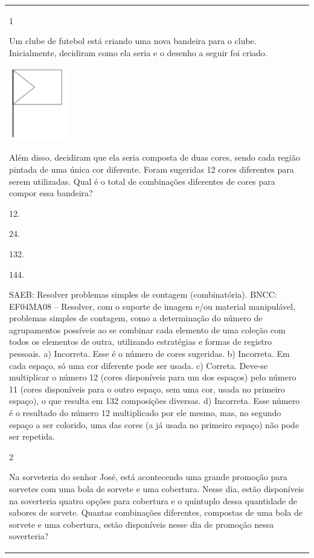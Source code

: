 \begin{mdframed}[linewidth=2pt,linecolor=salmao,roundcorner=2pt]
\begin{escolha}
{{{\begin{longtable}[]{@{}l@{}}
\begin{itemize}
{\num{1}

Um clube de futebol está criando uma nova bandeira para o clube.
Inicialmente, decidiram como ela seria e o desenho a seguir foi criado.

\includegraphics[width=1.02511in,height=1.26282in]{media/image140.png}

Além disso, decidiram que ela seria composta de duas cores, sendo cada
região pintada de uma única cor diferente. Foram sugeridas 12 cores
diferentes para serem utilizadas. Qual é o total de combinações
diferentes de cores para compor essa bandeira?

\begin{escolha}
\item
  12.
\item
  24.
\item
  132.
\item
  144.
\end{escolha}

SAEB: Resolver problemas simples de contagem (combinatória).
BNCC: EF04MA08 -- Resolver, com o suporte de imagem e/ou material manipulável, problemas simples
de contagem, como a determinação do número de agrupamentos possíveis ao se combinar cada
elemento de uma coleção com todos os elementos de outra, utilizando estratégias e formas de
registro pessoais.
a) Incorreta. Esse é o número de cores sugeridas.
b) Incorreta. Em cada espaço, só uma cor diferente pode ser usada.
c) Correta. Deve-se multiplicar o número 12 (cores disponíveis para um dos espaços) pelo número 11 (cores disponíveis para o outro espaço, sem uma cor, usada no primeiro espaço), o que resulta em 132 composições diversas.
d) Incorreta. Esse número é o resultado do número 12 multiplicado por ele mesmo, mas, no segundo espaço a ser colorido, uma das cores (a já usada no primeiro espaço) não pode ser repetida.

\num{2}

Na sorveteria do senhor José, está acontecendo uma grande promoção para
sorvetes com uma bola de sorvete e uma cobertura. Nesse dia, estão
disponíveis na soverteria quatro opções para cobertura e o quíntuplo dessa
quantidade de sabores de sorvete. Quantas combinações diferentes, compostas de uma bola de
sorvete e uma cobertura, estão disponíveis nesse dia de promoção nessa
soverteria?

}
\end{itemize}
\end{longtable}}}}
\end{escolha}
\end{mdframed}
